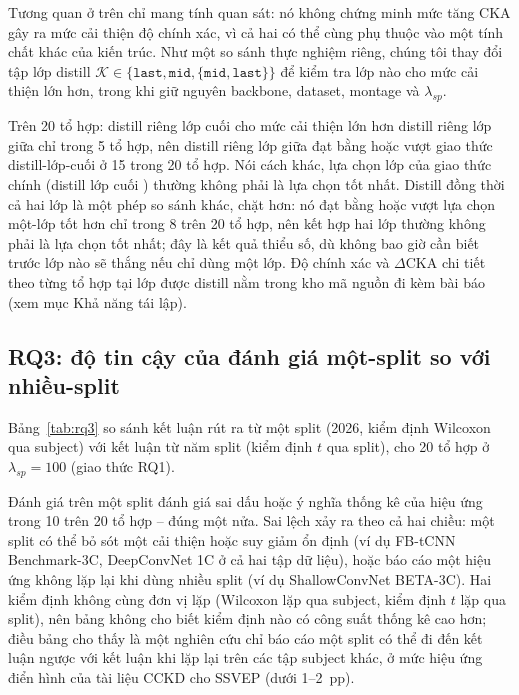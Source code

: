 \documentclass[11pt,a4paper,twoside,asymmetric]{article}
\begin{document}
Tương quan ở trên chỉ mang tính quan sát: nó không chứng minh mức tăng CKA gây ra mức cải thiện độ chính xác, vì cả hai có thể cùng phụ thuộc vào một tính chất khác của kiến trúc. Như một so sánh thực nghiệm riêng, chúng tôi thay đổi tập lớp distill $\mathcal{K} \in \{\texttt{last}, \texttt{mid}, \{\texttt{mid},\texttt{last}\}\}$ để kiểm tra lớp nào cho mức cải thiện lớn hơn, trong khi giữ nguyên backbone, dataset, montage và $\lambda_{sp}$.

Trên 20 tổ hợp: distill riêng lớp cuối cho mức cải thiện lớn hơn distill riêng lớp giữa chỉ trong 5 tổ hợp, nên distill riêng lớp giữa đạt bằng hoặc vượt giao thức distill-lớp-cuối ở 15 trong 20 tổ hợp. Nói cách khác, lựa chọn lớp của giao thức chính (distill lớp cuối \cite{R82}) thường không phải là lựa chọn tốt nhất. Distill đồng thời cả hai lớp là một phép so sánh khác, chặt hơn: nó đạt bằng hoặc vượt lựa chọn một-lớp tốt hơn chỉ trong 8 trên 20 tổ hợp, nên kết hợp hai lớp thường không phải là lựa chọn tốt nhất; đây là kết quả thiểu số, dù không bao giờ cần biết trước lớp nào sẽ thắng nếu chỉ dùng một lớp. Độ chính xác và $\Delta$CKA chi tiết theo từng tổ hợp tại lớp được distill nằm trong kho mã nguồn đi kèm bài báo (xem mục Khả năng tái lập).

\subsection{RQ3: độ tin cậy của đánh giá một-split so với nhiều-split}
\label{sec:rq3}

Bảng~\ref{tab:rq3} so sánh kết luận rút ra từ một split (2026, kiểm định Wilcoxon qua subject) với kết luận từ năm split (kiểm định $t$ qua split), cho 20 tổ hợp ở $\lambda_{sp}=100$ (giao thức RQ1).

Đánh giá trên một split đánh giá sai dấu hoặc ý nghĩa thống kê của hiệu ứng trong 10 trên 20 tổ hợp -- đúng một nửa. Sai lệch xảy ra theo cả hai chiều: một split có thể bỏ sót một cải thiện hoặc suy giảm ổn định (ví dụ FB-tCNN Benchmark-3C, DeepConvNet 1C ở cả hai tập dữ liệu), hoặc báo cáo một hiệu ứng không lặp lại khi dùng nhiều split (ví dụ ShallowConvNet BETA-3C). Hai kiểm định không cùng đơn vị lặp (Wilcoxon lặp qua subject, kiểm định $t$ lặp qua split), nên bảng không cho biết kiểm định nào có công suất thống kê cao hơn; điều bảng cho thấy là một nghiên cứu chỉ báo cáo một split có thể đi đến kết luận ngược với kết luận khi lặp lại trên các tập subject khác, ở mức hiệu ứng điển hình của tài liệu CCKD cho SSVEP (dưới 1--2~pp).
\end{document}
